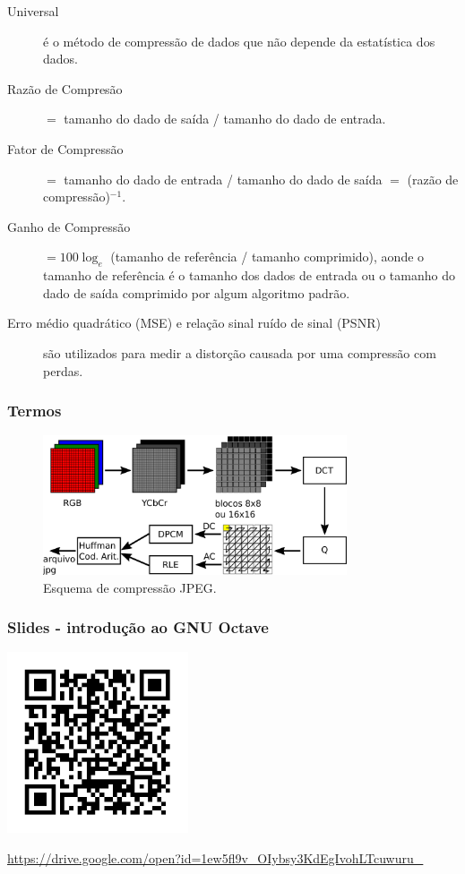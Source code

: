 \begin{frame}[allowframebreaks]
\begin{description}
  \item[Universal] é o método de compressão de dados que não depende da estatística dos dados.
  \item[Razão de Compresão] $=$ tamanho do dado de saída / tamanho do dado de entrada.
  \item[Fator de Compressão] $=$ tamanho do dado de entrada / tamanho do dado de saída $=$ (razão de compressão)$^{-1}$.
  \item[Ganho de Compressão] $= 100 \log_e $ (tamanho de referência / tamanho comprimido), aonde o tamanho de referência é o tamanho dos dados de entrada ou o tamanho do dado de saída comprimido por algum algoritmo padrão.
  \item[Erro médio quadrático (MSE) e relação sinal ruído de sinal (PSNR)] são utilizados para medir a distorção causada por uma compressão com perdas.
  \end{description}
\end{frame} 


\begin{frame}%
  \frametitle{Termos}
  \begin{figure}[h]
  \centering
  \includegraphics[width=0.8\textwidth]{images/jpegstd.pdf}
  \caption{Esquema de compressão JPEG.}\label{fig-jpegstd}
  \end{figure}
\end{frame} 

\begin{frame}%
  \frametitle{Slides - introdução ao GNU Octave}
  \centering
  \includegraphics[width=0.4\textwidth]{images/qrcode-octave-intro.pdf}

  \url{https://drive.google.com/open?id=1ew5fl9v_OIybsy3KdEgIvohLTcuwuru_}
\end{frame} 

